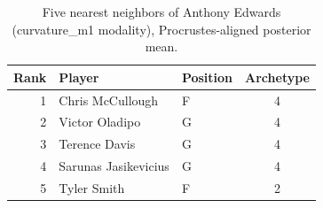 \begin{table}[htbp]
  \centering\small
  \begin{tabular}{rllc}
    \toprule
    Rank & Player & Position & Archetype \\
    \midrule
    1 & Chris McCullough & F & 4 \\
    2 & Victor Oladipo & G & 4 \\
    3 & Terence Davis & G & 4 \\
    4 & Sarunas Jasikevicius & G & 4 \\
    5 & Tyler Smith & F & 2 \\
    \bottomrule
  \end{tabular}
  \caption{Five nearest neighbors of Anthony Edwards (curvature_m1 modality), Procrustes-aligned posterior mean.}
  \label{tab:Anthony_Edwards_neighbors_curvature_m1}
\end{table}


